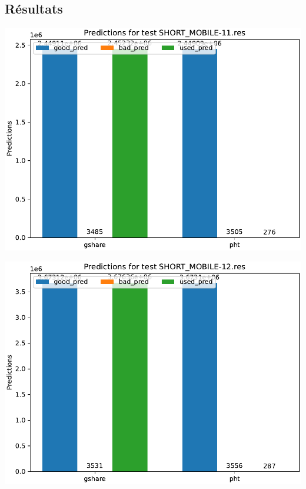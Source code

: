 \documentclass[a4paper]{article}
\begin{document}
\subsection{Résultats}
\begin{minipage}{.48\linewidth}
\includegraphics[width=\linewidth]{graphs/dual-predictor/preds_SHORT_MOBILE-11.res.pdf}
\end{minipage}%
\hfill
\begin{minipage}{.48\linewidth}
\includegraphics[width=\linewidth]{graphs/dual-predictor/preds_SHORT_MOBILE-12.res.pdf}
\end{minipage}
\end{document}
